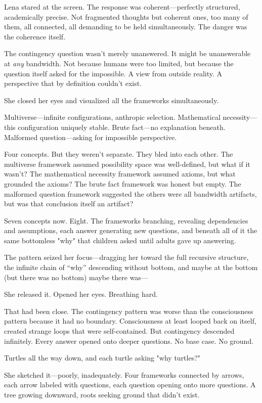 Lena stared at the screen. The response was coherent—perfectly structured, academically precise. Not fragmented thoughts but coherent ones, too many of them, all connected, all demanding to be held simultaneously. The danger was the coherence itself.

The contingency question wasn't merely unanswered. It might be unanswerable at \textit{any} bandwidth. Not because humans were too limited, but because the question itself asked for the impossible. A view from outside reality. A perspective that by definition couldn't exist.

She closed her eyes and visualized all the frameworks simultaneously.

Multiverse—infinite configurations, anthropic selection. Mathematical necessity—this configuration uniquely stable. Brute fact—no explanation beneath. Malformed question—asking for impossible perspective.

Four concepts. But they weren't separate. They bled into each other. The multiverse framework assumed possibility space was well-defined, but what if it wasn't? The mathematical necessity framework assumed axioms, but what grounded the axioms? The brute fact framework was honest but empty. The malformed question framework suggested the others were all bandwidth artifacts, but was that conclusion itself an artifact?

Seven concepts now. Eight. The frameworks branching, revealing dependencies and assumptions, each answer generating new questions, and beneath all of it the same bottomless "why" that children asked until adults gave up answering.

The pattern seized her focus—dragging her toward the full recursive structure, the infinite chain of ``why'' descending without bottom, and maybe at the bottom (but there was no bottom) maybe there was—

She released it. Opened her eyes. Breathing hard.

That had been close. The contingency pattern was worse than the consciousness pattern because it had no boundary. Consciousness at least looped back on itself, created strange loops that were self-contained. But contingency descended infinitely. Every answer opened onto deeper questions. No base case. No ground.

Turtles all the way down, and each turtle asking "why turtles?"

She sketched it—poorly, inadequately. Four frameworks connected by arrows, each arrow labeled with questions, each question opening onto more questions. A tree growing downward, roots seeking ground that didn't exist.


